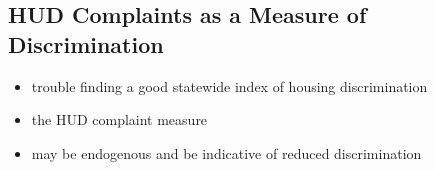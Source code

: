 \documentclass{article}
\begin{document}
  \subsection{HUD Complaints as a Measure of Discrimination}\label{sec:WhyHUD}
  
  \begin{itemize}
    \item trouble finding a good statewide index of housing discrimination
    \item the HUD complaint measure
    \item may be endogenous and be indicative of reduced discrimination
  
  \end{itemize}

\end{document}
